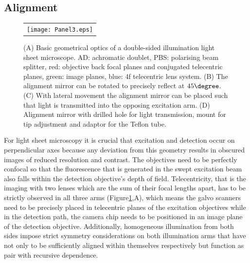 \documentclass[12pt]{spieman}  %
\begin{document}
	
	\subsection{Alignment}

\begin{figure}
   \begin{center}
   \begin{tabular}{c}
   \texttt{[image: Panel3.eps]}
   \end{tabular}
   \end{center}
   \caption{\label{fig:alignment} (A) Basic geometrical optics of a double-sided illumination light sheet microscope. AD: achromatic doublet, PBS: polarising beam splitter, red: objective back focal planes and conjugated telecentric planes, green: image planes, blue: 4f telecentric lens system. (B) The alignment mirror can be rotated to precisely reflect at $45\degree$. (C) With lateral movement the alignment mirror can be placed such that light is transmitted into the opposing excitation arm. (D) Alignment mirror with drilled hole for light transmission, mount for tip adjustment and adaptor for the Teflon tube.} 
   \end{figure}

For light sheet microscopy it is crucial that excitation and detection occur on perpendicular axes because any deviation from this geometry results in obscured images of reduced resolution and contrast. The objectives need to be perfectly confocal so that the fluorescence that is generated in the swept excitation beam also falls within the detection objective's depth of field. Telecentricity, that is the imaging with two lenses which are the sum of their focal lengths apart, has to be strictly observed in all three arms (Figure\ref{fig:alignment},A), which means the galvo scanners need to be precisely placed in telecentric planes of the excitation objectives while in the detection path, the camera chip needs to be positioned in an image plane of the detection objective. Additionally, homogeneous illumination from both sides impose strict symmetry considerations on both illumination arms that have not only to be sufficiently aligned within themselves respectively but function as pair with recursive dependence. 
\end{document}
